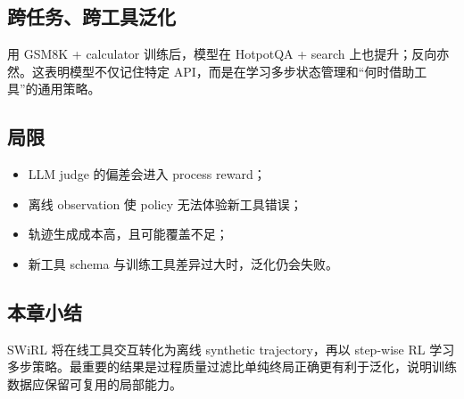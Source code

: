 \subsection{跨任务、跨工具泛化}

用 GSM8K + calculator 训练后，模型在 HotpotQA + search 上也提升；反向亦然。这表明模型不仅记住特定 API，而是在学习多步状态管理和“何时借助工具”的通用策略。




\subsection{局限}

\begin{itemize}
    \item LLM judge 的偏差会进入 process reward；
    \item 离线 observation 使 policy 无法体验新工具错误；
    \item 轨迹生成成本高，且可能覆盖不足；
    \item 新工具 schema 与训练工具差异过大时，泛化仍会失败。
\end{itemize}

\subsection{本章小结}

SWiRL 将在线工具交互转化为离线 synthetic trajectory，再以 step-wise RL 学习多步策略。最重要的结果是过程质量过滤比单纯终局正确更有利于泛化，说明训练数据应保留可复用的局部能力。


